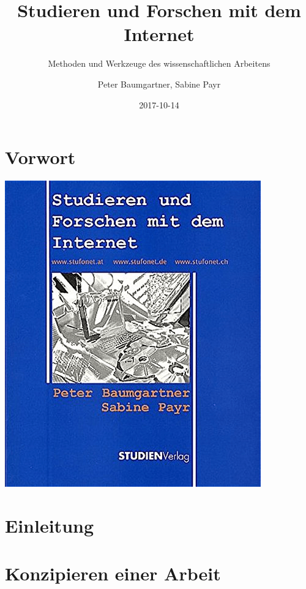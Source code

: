\documentclass[]{book}
\title{Studieren und Forschen mit dem Internet}
\subtitle{Methoden und Werkzeuge des wissenschaftlichen Arbeitens}
\author{Peter Baumgartner, Sabine Payr}
\date{2017-10-14}
\theoremstyle{definition}
\theoremstyle{definition}
\theoremstyle{definition}
\theoremstyle{remark}
\begin{document}
\maketitle

{
\hypersetup{linkcolor=black}
\setcounter{tocdepth}{2}
\tableofcontents
}
\chapter*{Vorwort}\label{vorwort}

\begin{center}\href{http://www.studienverlag.at/page.cfm?vpath=buecher/buchdetail&titnr=1319}{\includegraphics{images/cover-stufonet-min} }\end{center}

\chapter*{Einleitung}\label{einleitung}

\chapter{Konzipieren einer Arbeit}\label{konzipieren-einer-arbeit}
\end{document}
